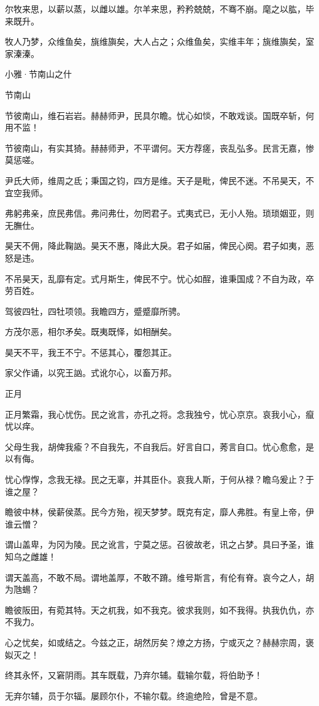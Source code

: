 尔牧来思，以薪以蒸，以雌以雄。尔羊来思，矜矜兢兢，不骞不崩。麾之以肱，毕来既升。

牧人乃梦，众维鱼矣，旐维旟矣，大人占之；众维鱼矣，实维丰年；旐维旟矣，室家溱溱。




小雅·节南山之什


节南山

节彼南山，维石岩岩。赫赫师尹，民具尔瞻。忧心如惔，不敢戏谈。国既卒斩，何用不监！

节彼南山，有实其猗。赫赫师尹，不平谓何。天方荐瘥，丧乱弘多。民言无嘉，惨莫惩嗟。

尹氏大师，维周之氐；秉国之钧，四方是维。天子是毗，俾民不迷。不吊昊天，不宜空我师。

弗躬弗亲，庶民弗信。弗问弗仕，勿罔君子。式夷式已，无小人殆。琐琐姻亚，则无膴仕。

昊天不佣，降此鞠訩。昊天不惠，降此大戾。君子如届，俾民心阕。君子如夷，恶怒是违。

不吊昊天，乱靡有定。式月斯生，俾民不宁。忧心如酲，谁秉国成？不自为政，卒劳百姓。

驾彼四牡，四牡项领。我瞻四方，蹙蹙靡所骋。

方茂尔恶，相尔矛矣。既夷既怿，如相酬矣。

昊天不平，我王不宁。不惩其心，覆怨其正。

家父作诵，以究王訩。式讹尔心，以畜万邦。

正月

正月繁霜，我心忧伤。民之讹言，亦孔之将。念我独兮，忧心京京。哀我小心，癙忧以痒。

父母生我，胡俾我瘉？不自我先，不自我后。好言自口，莠言自口。忧心愈愈，是以有侮。

忧心惸惸，念我无禄。民之无辜，并其臣仆。哀我人斯，于何从禄？瞻乌爰止？于谁之屋？

瞻彼中林，侯薪侯蒸。民今方殆，视天梦梦。既克有定，靡人弗胜。有皇上帝，伊谁云憎？

谓山盖卑，为冈为陵。民之讹言，宁莫之惩。召彼故老，讯之占梦。具曰予圣，谁知乌之雌雄！

谓天盖高，不敢不局。谓地盖厚，不敢不蹐。维号斯言，有伦有脊。哀今之人，胡为虺蜴？

瞻彼阪田，有菀其特。天之杌我，如不我克。彼求我则，如不我得。执我仇仇，亦不我力。

心之忧矣，如或结之。今兹之正，胡然厉矣？燎之方扬，宁或灭之？赫赫宗周，褒姒灭之！

终其永怀，又窘阴雨。其车既载，乃弃尔辅。载输尔载，将伯助予！

无弃尔辅，员于尔辐。屡顾尔仆，不输尔载。终逾绝险，曾是不意。

